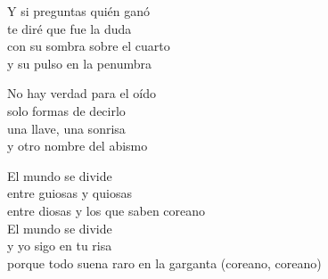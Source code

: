 \begin{lyrics}
Y si preguntas quién ganó\\
te diré que fue la duda\\
con su sombra sobre el cuarto\\
y su pulso en la penumbra

No hay verdad para el oído\\
solo formas de decirlo\\
una llave, una sonrisa\\
y otro nombre del abismo

El mundo se divide\\
entre guiosas y quiosas\\
entre diosas y los que saben coreano\\
El mundo se divide\\
y yo sigo en tu risa\\
porque todo suena raro en la garganta
(coreano, coreano)
\end{lyrics}
